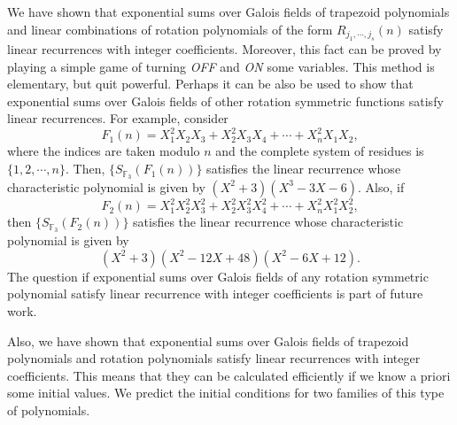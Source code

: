 
We have shown that exponential sums over Galois fields of trapezoid polynomials and linear combinations of rotation polynomials of the form $R_{j_1,\cdots, j_s}(n)$ satisfy linear recurrences with integer 
coefficients.  Moreover, this fact can be proved by playing a simple game of turning {\it OFF} and {\it ON} some variables.  This method is elementary, but quit powerful.  Perhaps it can be also be used to 
show that exponential sums over Galois fields of other rotation symmetric functions satisfy linear recurrences.  For example, consider 
$$F_1(n) = X_1^2X_2X_3+X_2^2X_3X_4+\cdots+X_n^2 X_1 X_2,$$
where the indices are taken modulo $n$ and the complete system of residues is $\{1, 2,\cdots , n\}$.  Then, $\{S_{\mathbb{F}_3}(F_1(n))\}$ satisfies the linear recurrence whose characteristic polynomial is given by
$\left(X^2+3\right) \left(X^3-3 X-6\right)$.  Also, if
$$F_2(n) = X_1^2X_2^2X_3^2+X_2^2X_3^2X_4^2+\cdots+X_n^2 X_1^2 X_2^2,$$
then $\{S_{\mathbb{F}_3}(F_2(n))\}$ satisfies the linear recurrence whose characteristic polynomial is given by $$\left(X^2+3\right) \left(X^2-12 X+48\right) \left(X^2-6 X+12\right).$$
The question if exponential sums over Galois fields of any rotation symmetric polynomial satisfy linear recurrence with integer coefficients is part of future work.

Also, we have shown that exponential sums over Galois fields of trapezoid polynomials and rotation polynomials satisfy linear recurrences with integer coefficients.  This means that they can be
calculated efficiently if we know a priori some initial values. We predict the initial conditions for two families of this type of polynomials.

